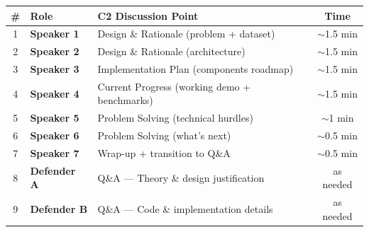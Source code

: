 \documentclass[11pt,a4paper]{article}
\begin{document}
\begin{center}
\renewcommand{\arraystretch}{1.25}
\begin{tabular}{@{}cllc@{}}
\toprule
\textbf{\#} & \textbf{Role} & \textbf{C2 Discussion Point} & \textbf{Time} \\
\midrule
1 & \textcolor{blue!70!black}{\textbf{Speaker 1}} & Design \& Rationale (problem + dataset) & $\sim$1.5 min \\
2 & \textcolor{orange!80!black}{\textbf{Speaker 2}} & Design \& Rationale (architecture) & $\sim$1.5 min \\
3 & \textcolor{teal!80!black}{\textbf{Speaker 3}} & Implementation Plan (components roadmap) & $\sim$1.5 min \\
4 & \textcolor{violet!80!black}{\textbf{Speaker 4}} & Current Progress (working demo + benchmarks) & $\sim$1.5 min \\
5 & \textcolor{red!70!black}{\textbf{Speaker 5}} & Problem Solving (technical hurdles) & $\sim$1 min \\
6 & \textcolor{green!50!black}{\textbf{Speaker 6}} & Problem Solving (what's next) & $\sim$0.5 min \\
7 & \textcolor{brown!80!black}{\textbf{Speaker 7}} & Wrap-up + transition to Q\&A & $\sim$0.5 min \\
\midrule
8 & \textcolor{gray!70!black}{\textbf{Defender A}} & Q\&A --- Theory \& design justification & as needed \\
9 & \textcolor{gray!70!black}{\textbf{Defender B}} & Q\&A --- Code \& implementation details & as needed \\
\bottomrule
\end{tabular}
\end{center}

\newpage
\end{document}
